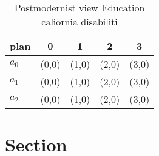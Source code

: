 \documentclass[a4paper]{article}
\begin{document}
\begin{table}
\begin{adjustbox}{width=0.6\columnwidth}
\begin{tabular}{|l|l|l|l|l|}
\hline
\textbf{plan} & \multicolumn{1}{c|}{\textbf{0}} & \multicolumn{1}{c|}{\textbf{1}} & \multicolumn{1}{c|}{\textbf{2}} & \multicolumn{1}{c|}{\textbf{3}} \\ \hline
\textbf{$a_0$}  & (0,0) & (1,0) & (2,0) & (3,0) \\ \hline
\textbf{$a_1$}  & (0,0) & (1,0) & (2,0) & (3,0) \\ \hline
\textbf{$a_2$}  & (0,0) & (1,0) & (2,0) & (3,0) \\ \hline
\end{tabular}
\end{adjustbox}
\caption{Postmodernist view Education caliornia disabiliti
}
\end{table}

\section{Section}
\end{document}
